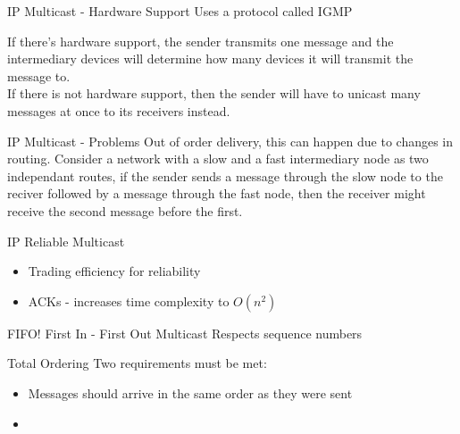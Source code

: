 \documentclass[aspectratio=1610,17pt,utf8]{beamer}
\begin{document}
\begin{frame}{IP Multicast - Hardware Support}
    Uses a protocol called IGMP

    If there's hardware support, the sender transmits one message and the intermediary devices will determine how many devices it will transmit the message to.\\
    If there is not hardware support, then the sender will have to unicast many messages at once to its receivers instead.
\end{frame}

\begin{frame}{IP Multicast - Problems}
    Out of order delivery, this can happen due to changes in routing. Consider a network with a slow and a fast intermediary node as two independant routes, if the sender sends a message through the slow node to the reciver followed by a message through the fast node, then the receiver might receive the second message before the first.
\end{frame}

\begin{frame}{IP Reliable Multicast}
    \begin{itemize}
        \item Trading efficiency for reliability
        \item ACKs - increases time complexity to $O(n^2)$
    \end{itemize}
\end{frame}

\begin{frame}{FIFO! First In - First Out Multicast}
    Respects sequence numbers

\end{frame}

\begin{frame}{Total Ordering}
    Two requirements must be met:
    \begin{itemize}
        \item Messages should arrive in the same order as they were sent
        \item 
    \end{itemize}
\end{frame}
\end{document}
